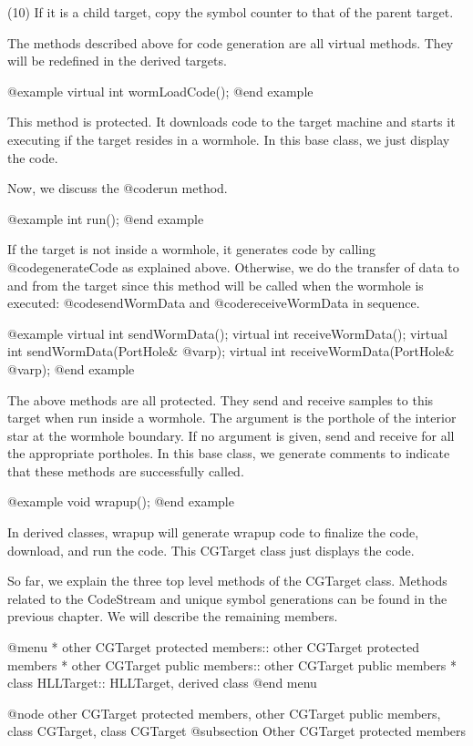 (10) If it is a child target, copy the symbol counter to that of the parent
target.

The methods described above for code generation are all virtual methods.
They will be redefined in the derived targets. 

@example
virtual int wormLoadCode();
@end example

This method is protected. It downloads code to the target machine and starts
it executing if the target resides in a wormhole. In this base class, we
just display the code.

Now, we discuss the @code{run} method.

@example
int run();
@end example

If the target is not inside a wormhole, it generates code by calling
@code{generateCode} as explained above. Otherwise, we do the transfer of
data to and from the target since this method will be called when the
wormhole is executed: @code{sendWormData} and @code{receiveWormData}
in sequence.

@example
virtual int sendWormData();
virtual int receiveWormData();
virtual int sendWormData(PortHole& @var{p});
virtual int receiveWormData(PortHole& @var{p});
@end example

The above methods are all protected. They send and receive samples to this
target when run inside a wormhole. The argument is the porthole of the
interior star at the wormhole boundary. If no argument is given, send and
receive for all the appropriate portholes. In this base class, we generate
comments to indicate that these methods are successfully called.

@example
void wrapup();
@end example

In derived classes, wrapup will generate wrapup code to finalize the code,
download, and run the code. This CGTarget class just displays the code.

So far, we explain the three top level methods of the CGTarget class.
Methods related to the CodeStream and unique symbol generations can
be found in the previous chapter. We will describe the remaining members.

@menu
* other CGTarget protected members::	other CGTarget protected members
* other CGTarget public members::	other CGTarget public members
* class HLLTarget::			HLLTarget, derived class
@end menu

@node other CGTarget protected members, other CGTarget public members, class CGTarget, class CGTarget
@subsection Other CGTarget protected members

